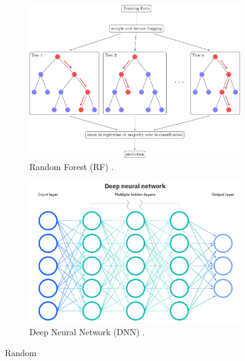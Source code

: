 \begin{figure}[h]
    \centering
    \begin{subfigure}[t]{0.45\textwidth}
      \includegraphics[width=\linewidth]{imgs/models/random-forest.png}
      \caption{Random Forest (RF) \citep{riebesellRandomForest2022}.} \label{fig:rf}
    \end{subfigure}%
    \hspace{3em}%
    \begin{subfigure}[t]{0.45\textwidth}
        \includegraphics[width=\linewidth]{imgs/models/DNN.png}
        \caption{Deep Neural Network (DNN) \citep{ibmNeuralNetworks2022}.} \label{fig:dnn}
    \end{subfigure}%
  \caption{Random } \label{fig:rf-dnn}
\end{figure}

